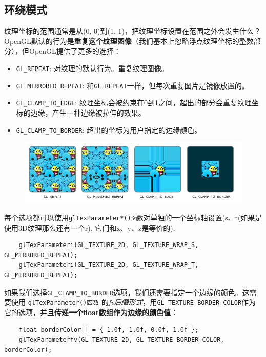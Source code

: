 \documentclass[UTF8,a4paper,12pt]{ctexbook}
\begin{document}
			
		\subsection{环绕模式}
			纹理坐标的范围通常是从(0, 0)到(1, 1)，把纹理坐标设置在范围之外会发生什么？OpenGL默认的行为是\textbf{重复这个纹理图像}（我们基本上忽略浮点纹理坐标的整数部分），但OpenGL提供了更多的选择：
			
			\begin{itemize}
				\item \verb|GL_REPEAT|:	对纹理的默认行为。重复纹理图像。
				\item \verb|GL_MIRRORED_REPEAT|:	和\verb|GL_REPEAT|一样，但每次重复图片是镜像放置的。
				\item \verb|GL_CLAMP_TO_EDGE|:	纹理坐标会被约束在0到1之间，超出的部分会重复纹理坐标的边缘，产生一种边缘被拉伸的效果。
				\item \verb|GL_CLAMP_TO_BORDER|:	超出的坐标为用户指定的边缘颜色。
			\end{itemize}
			
			\begin{figure}[H]
				\centering
				\includegraphics[width=.95\linewidth]{texture_wrapping}
			\end{figure}
			
			每个选项都可以使用\verb|glTexParameter*()函数|对单独的一个坐标轴设置(s、t(如果是使用3D纹理那么还有一个r), 它们和x、y、z是等价的).
			
			\begin{lstlisting}
	glTexParameteri(GL_TEXTURE_2D, GL_TEXTURE_WRAP_S, GL_MIRRORED_REPEAT);
	glTexParameteri(GL_TEXTURE_2D, GL_TEXTURE_WRAP_T, GL_MIRRORED_REPEAT);
			\end{lstlisting}
			
			如果我们选择\verb|GL_CLAMP_TO_BORDER|选项，我们还需要指定一个边缘的颜色。这需要使用 \verb|glTexParameter()函数| 的\textit{fv后缀形式}，用\verb|GL_TEXTURE_BORDER_COLOR|作为它的选项，并且\textbf{传递一个float数组作为边缘的颜色值}：
			\begin{lstlisting}
	float borderColor[] = { 1.0f, 1.0f, 0.0f, 1.0f };
	glTexParameterfv(GL_TEXTURE_2D, GL_TEXTURE_BORDER_COLOR, borderColor);
			\end{lstlisting}
			
\end{document}
